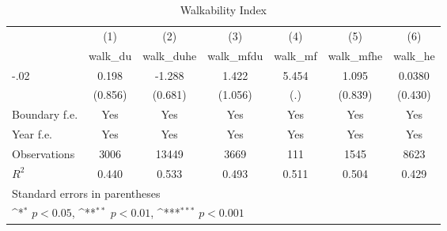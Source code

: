 \begin{table}[htbp]\centering
\def\sym#1{\ifmmode^{#1}\else\(^{#1}\)\fi}
\caption{Walkability Index}
\begin{tabular}{l*{6}{c}}
\hline\hline
                    &\multicolumn{1}{c}{(1)}&\multicolumn{1}{c}{(2)}&\multicolumn{1}{c}{(3)}&\multicolumn{1}{c}{(4)}&\multicolumn{1}{c}{(5)}&\multicolumn{1}{c}{(6)}\\
                    &\multicolumn{1}{c}{walk\_du}&\multicolumn{1}{c}{walk\_duhe}&\multicolumn{1}{c}{walk\_mfdu}&\multicolumn{1}{c}{walk\_mf}&\multicolumn{1}{c}{walk\_mfhe}&\multicolumn{1}{c}{walk\_he}\\
\hline
-.02                &       0.198         &      -1.288         &       1.422         &       5.454         &       1.095         &      0.0380         \\
                    &     (0.856)         &     (0.681)         &     (1.056)         &         (.)         &     (0.839)         &     (0.430)         \\
[1em]
Boundary f.e.       &         Yes         &         Yes         &         Yes         &         Yes         &         Yes         &         Yes         \\
[1em]
Year f.e.           &         Yes         &         Yes         &         Yes         &         Yes         &         Yes         &         Yes         \\
\hline
Observations        &        3006         &       13449         &        3669         &         111         &        1545         &        8623         \\
\(R^{2}\)           &       0.440         &       0.533         &       0.493         &       0.511         &       0.504         &       0.429         \\
\hline\hline
\multicolumn{7}{l}{\footnotesize Standard errors in parentheses}\\
\multicolumn{7}{l}{\footnotesize \sym{*} \(p<0.05\), \sym{**} \(p<0.01\), \sym{***} \(p<0.001\)}\\
\end{tabular}
\end{table}
